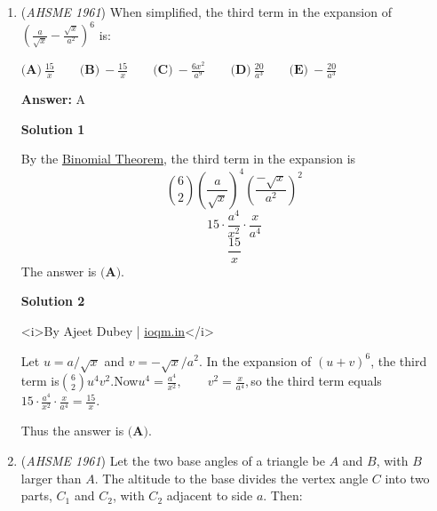\begin{enumerate}
 



\textbf{Solution 2}

$\frac{\log 8}{\log \frac{1}{8}} = \log_{\frac{1}{8}}{8} = \boxed{\textbf{(E)}\ {-1}}$.

 -j314andrews

 



\textbf{Solution 3}

<i>By Ajeet Dubey | \href{https://ioqm.in}{ioqm.in}</i>

 Use the logarithm rule $\log(u^{-1})=-\log u$. Since $1/8=8^{-1}$,$\log\left(\frac18\right)=\log(8^{-1})=-\log8.$Therefore$\frac{\log8}{\log(1/8)}=\frac{\log8}{-\log8}=-1.$

 Thus the answer is $\boxed{\textbf{(E)}}$.

 


	\item (\textit{AHSME 1961}) When simplified, the third term in the expansion of $(\frac{a}{\sqrt{x}}-\frac{\sqrt{x}}{a^2})^6$ is:


 $\textbf{(A)}\ \frac{15}{x}\qquad \textbf{(B)}\ -\frac{15}{x}\qquad \textbf{(C)}\ -\frac{6x^2}{a^9} \qquad \textbf{(D)}\ \frac{20}{a^3}\qquad \textbf{(E)}\ -\frac{20}{a^3}$

 \textbf{Answer: }A



\textbf{Solution 1}

By the \href{https://artofproblemsolving.com/wiki/index.php?title=Binomial\_Theorem}{Binomial Theorem}, the third term in the expansion is
 \[\binom{6}{2}(\frac{a}{\sqrt{x}})^{4}(\frac{-\sqrt{x}}{a^2})^2\]
 \[15 \cdot \frac{a^4}{x^2} \cdot \frac{x}{a^4}\]
 \[\frac{15}{x}\]The answer is $\boxed{\textbf{(A)}}$.

 



\textbf{Solution 2}

<i>By Ajeet Dubey | \href{https://ioqm.in}{ioqm.in}</i>

 Let $u=a/\sqrt{x}$ and $v=-\sqrt{x}/a^2$. In the expansion of $(u+v)^6$, the third term is$\binom62u^4v^2.$Now$u^4=\frac{a^4}{x^2},\qquad v^2=\frac{x}{a^4},$so the third term equals$15\cdot\frac{a^4}{x^2}\cdot\frac{x}{a^4}=\frac{15}{x}.$

 Thus the answer is $\boxed{\textbf{(A)}}$.

 


	\item (\textit{AHSME 1961}) Let the two base angles of a triangle be $A$ and $B$, with $B$ larger than $A$. 
The altitude to the base divides the vertex angle $C$ into two parts, $C_1$ and $C_2$, with $C_2$ adjacent to side $a$. Then:



\end{enumerate}
